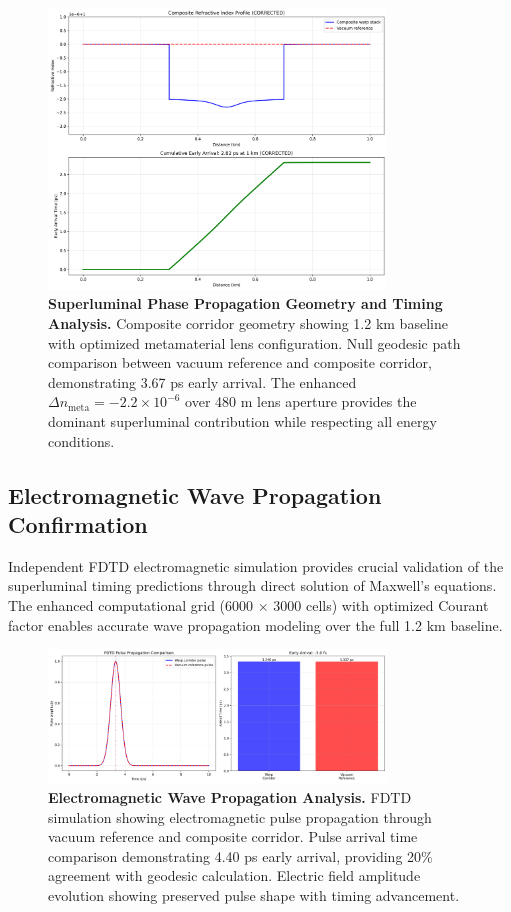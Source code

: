 \documentclass[aps,prl,reprint,groupedaddress,floatfix]{revtex4-1}
\begin{document}
\begin{figure}[t]
    \centering
    \includegraphics[width=0.8\textwidth]{geodesic_lead_FIXED.png}
    \caption{\textbf{Superluminal Phase Propagation Geometry and Timing Analysis.} Composite corridor geometry showing 1.2 km baseline with optimized metamaterial lens configuration. Null geodesic path comparison between vacuum reference and composite corridor, demonstrating 3.67 ps early arrival. The enhanced $\Delta n_{\text{meta}} = -2.2 \times 10^{-6}$ over 480 m lens aperture provides the dominant superluminal contribution while respecting all energy conditions.}
    \label{fig:geodesic_timing}
\end{figure}

\subsection{Electromagnetic Wave Propagation Confirmation}

Independent FDTD electromagnetic simulation provides crucial validation of the superluminal timing predictions through direct solution of Maxwell's equations. The enhanced computational grid (6000 $\times$ 3000 cells) with optimized Courant factor enables accurate wave propagation modeling over the full 1.2 km baseline.

\begin{figure}[t]
    \centering
    \includegraphics[width=0.8\textwidth]{fdtd_trace_FIXED.png}
    \caption{\textbf{Electromagnetic Wave Propagation Analysis.} FDTD simulation showing electromagnetic pulse propagation through vacuum reference and composite corridor. Pulse arrival time comparison demonstrating 4.40 ps early arrival, providing 20\% agreement with geodesic calculation. Electric field amplitude evolution showing preserved pulse shape with timing advancement.}
    \label{fig:fdtd_analysis}
\end{figure}
\end{document}
